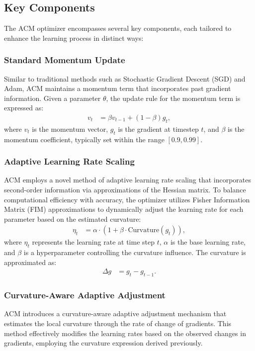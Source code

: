 \documentclass{article} %
\begin{document}
\subsection{Key Components}
The ACM optimizer encompasses several key components, each tailored to enhance the learning process in distinct ways:

\subsubsection{Standard Momentum Update}
Similar to traditional methods such as Stochastic Gradient Descent (SGD) and Adam, ACM maintains a momentum term that incorporates past gradient information. Given a parameter $\theta$, the update rule for the momentum term is expressed as:
\begin{align}
v_t &= \beta v_{t-1} + (1 - \beta) g_t,  
\end{align}
where $v_t$ is the momentum vector, $g_t$ is the gradient at timestep $t$, and $\beta$ is the momentum coefficient, typically set within the range $[0.9, 0.99]$.

\subsubsection{Adaptive Learning Rate Scaling}
ACM employs a novel method of adaptive learning rate scaling that incorporates second-order information via approximations of the Hessian matrix. To balance computational efficiency with accuracy, the optimizer utilizes Fisher Information Matrix (FIM) approximations to dynamically adjust the learning rate for each parameter based on the estimated curvature:
\begin{align}
\eta_t &= \alpha \cdot \left( 1 + \beta \cdot \text{Curvature}(g_t) \right),
\end{align}
where $\eta_t$ represents the learning rate at time step $t$, $\alpha$ is the base learning rate, and $\beta$ is a hyperparameter controlling the curvature influence. The curvature is approximated as:
\begin{align}
\Delta g &= g_t - g_{t-1}.\end{align}

\subsubsection{Curvature-Aware Adaptive Adjustment}
ACM introduces a curvature-aware adaptive adjustment mechanism that estimates the local curvature through the rate of change of gradients. This method effectively modifies the learning rates based on the observed changes in gradients, employing the curvature expression derived previously.
\end{document}
